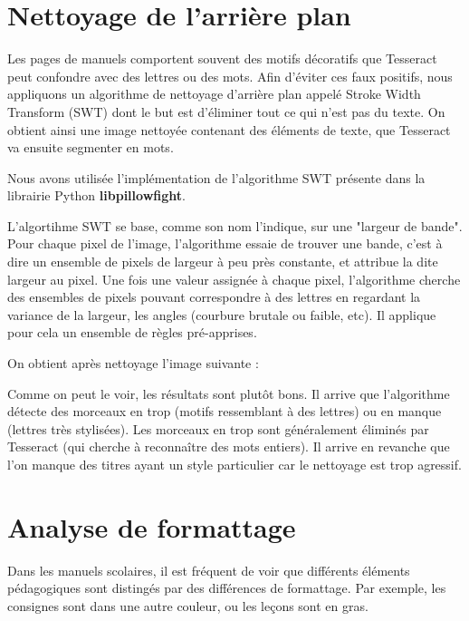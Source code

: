 \documentclass[a4paper, 12pt]{article}
\begin{document}
\section{Nettoyage de l'arrière plan}

Les pages de manuels comportent souvent des motifs décoratifs que Tesseract peut confondre avec des lettres ou des mots. Afin d'éviter ces faux positifs, nous appliquons un algorithme de nettoyage d'arrière plan appelé Stroke Width Transform (SWT) %
 dont le but est d'éliminer tout ce qui n'est pas du texte. On obtient ainsi une image nettoyée contenant des éléments de texte, que Tesseract va ensuite segmenter en mots.

Nous avons utilisée l'implémentation de l'algorithme SWT présente dans la librairie Python \textbf{libpillowfight}.

L'algortihme SWT se base, comme son nom l'indique, sur une "largeur de bande". Pour chaque pixel de l'image, l'algorithme essaie de trouver une bande, c'est à dire un ensemble de pixels de largeur à peu près constante, et attribue la dite largeur au pixel. Une fois une valeur assignée à chaque pixel, l'algorithme cherche des ensembles de pixels pouvant correspondre à des lettres en regardant la variance de la largeur, les angles (courbure brutale ou faible, etc). Il applique pour cela un ensemble de règles pré-apprises.

On obtient après nettoyage l'image suivante :

\begin{center}
\end{center}

Comme on peut le voir, les résultats sont plutôt bons. Il arrive que l'algorithme détecte des morceaux en trop (motifs ressemblant à des lettres) ou en manque (lettres très stylisées). Les morceaux en trop sont généralement éliminés par Tesseract (qui cherche à reconnaître des mots entiers). Il arrive en revanche que l'on manque des titres ayant un style particulier car le nettoyage est trop agressif. 


\section{Analyse de formattage}
Dans les manuels scolaires, il est fréquent de voir que différents éléments pédagogiques sont distingés par des différences de formattage. Par exemple, les consignes sont dans une autre couleur, ou les leçons sont en gras. 
\end{document}
